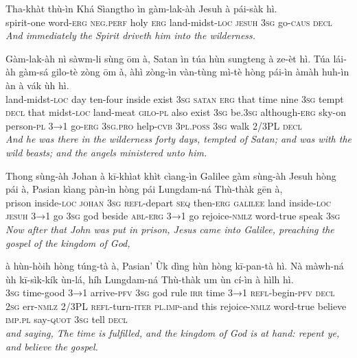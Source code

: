 \documentclass[11pt,a4paper]{article}
\begin{document}
\begin{exe}
\gll Tha-khàt thù-ìn Khá Sìangtho ìn gàm-lak-àh Jesuh à pái-sàk hì. \\
     spirit-one word-\textsc{erg} \textsc{neg}.\textsc{perf} holy \textsc{erg} land-midst-\textsc{loc} \textsc{jesuh} \textsc{3sg} go-\textsc{caus} \textsc{decl} \\
\glt \textcolor{kjvcolor}{\textit{And immediately the Spirit driveth him into the wilderness.}}

\gll Gàm-lak-àh nì sàwm-li sùng ōm à, Satan ìn túa hùn sungteng à ze-èt hì. Túa lái-àh gàm-sá gilo-tè zòng ōm à, àhì zòng-ìn vàn-tùng mì-tè hòng pái-ìn àmàh huh-ìn àn à vák ùh hì. \\
     land-midst-\textsc{loc} day ten-four inside exist \textsc{3sg} \textsc{satan} \textsc{erg} that time nine \textsc{3sg} tempt \textsc{decl} that midst-\textsc{loc} land-meat \textsc{gilo}-\textsc{pl} also exist \textsc{3sg} be.\textsc{3sg} although-\textsc{erg} sky-on person-\textsc{pl} \textsc{3→1} go-\textsc{erg} \textsc{3sg}.\textsc{pro} help-\textsc{cvb} \textsc{3pl}.\textsc{poss} \textsc{3sg} walk 2/3PL \textsc{decl} \\
\glt \textcolor{kjvcolor}{\textit{And he was there in the wilderness forty days, tempted of Satan; and was with the wild beasts; and the angels ministered unto him.}}

\gll Thong sùng-àh Johan à kī-khìat khìt cìang-ìn Galilee gàm sùng-àh Jesuh hòng pái à, Pasian kìang pàn-ìn hòng pái Lungdam-ná Thù-thàk gēn à, \\
     prison inside-\textsc{loc} \textsc{johan} \textsc{3sg} \textsc{refl}-depart \textsc{seq} then-\textsc{erg} \textsc{galilee} land inside-\textsc{loc} \textsc{jesuh} \textsc{3→1} go \textsc{3sg} god beside \textsc{abl}-\textsc{erg} \textsc{3→1} go rejoice-\textsc{nmlz} word-true speak \textsc{3sg} \\
\glt \textcolor{kjvcolor}{\textit{Now after that John was put in prison, Jesus came into Galilee, preaching the gospel of the kingdom of God,}}

\gll à hùn-hòih hòng túng-tà à, Pasian' Ùk dìng hùn hòng kī-pan-tà hì. Nà màwh-ná ùh kī-sìk-kík ùn-lá, híh Lungdam-ná Thù-thàk um ùn cí-ìn à hìlh hì. \\
     \textsc{3sg} time-good \textsc{3→1} arrive-\textsc{pfv} \textsc{3sg} god rule \textsc{irr} time \textsc{3→1} \textsc{refl}-begin-\textsc{pfv} \textsc{decl} \textsc{2sg} err-\textsc{nmlz} 2/3PL \textsc{refl}-turn-\textsc{iter} \textsc{pl}.\textsc{imp}-and this rejoice-\textsc{nmlz} word-true believe \textsc{imp}.\textsc{pl} say-\textsc{quot} \textsc{3sg} tell \textsc{decl} \\
\glt \textcolor{kjvcolor}{\textit{and saying, The time is fulfilled, and the kingdom of God is at hand: repent ye, and believe the gospel.}}


\end{exe}
\end{document}
